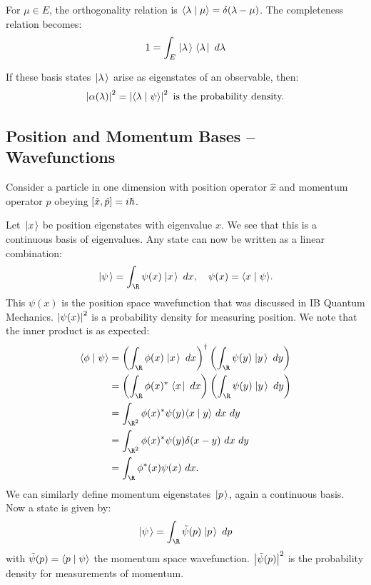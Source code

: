 \documentclass[../Main.tex]{subfiles}
\begin{document}
For $\mu \in E$, the orthogonality relation is $\langle\lambda\mid\mu\rangle = \delta(\lambda - \mu)$. The completeness relation becomes:
\begin{equation*}
    1 = \int_E \left.\left|\lambda\right.\right\rangle\left.\left\langle\lambda\right.\right|~d\lambda
\end{equation*}

If these basis states $\left.\left|\lambda\right.\right\rangle$ arise as eigenstates of an observable, then:
\begin{equation*}
    \left|\alpha(\lambda)\right|^2 = \left|\langle\lambda\mid\psi\rangle\right|^2 \text{ is the probability density.}
\end{equation*}
\subsection{Position and Momentum Bases -- Wavefunctions}
Consider a particle in one dimension with position operator $\hat{x}$ and momentum operator $\hat{p}$ obeying $\left[\hat{x}, \hat{p}\right] = i\hbar$.

Let $\left.\left|x\right.\right\rangle$ be position eigenstates with eigenvalue $x$. We see that this is a continuous basis of eigenvalues. Any state can now be written as a linear combination:
\begin{equation*}
    \state = \int_\R \psi(x) \ket{x}~dx,\quad \psi(x) = \inn{x}{\psi}.
\end{equation*}
This $\psi(x)$ is the position space wavefunction that was discussed in IB Quantum Mechanics. $\left|\psi(x)\right|^2$ is a probability density for measuring position. We note that the inner product is as expected:
\begin{align*}
    \inn{\phi}{\psi} &= \left(\int_{\R} \phi(x) \ket{x}~dx\right)^\dagger \left(\int_{\R} \psi(y) \ket{y}~dy\right) \\
    &= \left(\int_{\R} \phi(x)^* \bra{x}~dx\right) \left(\int_{\R} \psi(y) \ket{y}~dy\right) \\
    &= \int_{\R^2} \phi(x)^*\psi(y) \inn{x}{y}~dx~dy \\
    &= \int_{\R^2} \phi(x)^*\psi(y) \delta(x - y)~dx~dy \\
    &= \int_{\R} \phi^*(x) \psi(x)~dx.
\end{align*}
We can similarly define momentum eigenstates $\left.\left|p\right.\right\rangle$, again a continuous basis. Now a state is given by:
\begin{equation*}
    \state = \int_{\R} \tilde{\psi}(p) \ket{p}~dp
\end{equation*}
with $\tilde{\psi}(p) = \langle p\mid\psi\rangle$ the momentum space wavefunction. $\left|\tilde{\psi}(p)\right|^2$ is the probability density for measurements of momentum.
\end{document}

